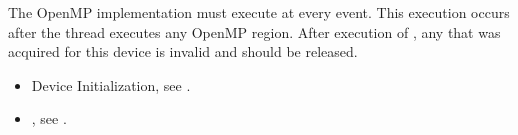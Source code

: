 \descr
The OpenMP implementation must execute  
at every  event. This execution occurs after 
the thread executes any OpenMP region. After execution of 
, any  that 
was acquired for this device is invalid and should be released.

\crossreferences
\begin{itemize}
\item Device Initialization, see .

\item {}, 
see .
\end{itemize}

